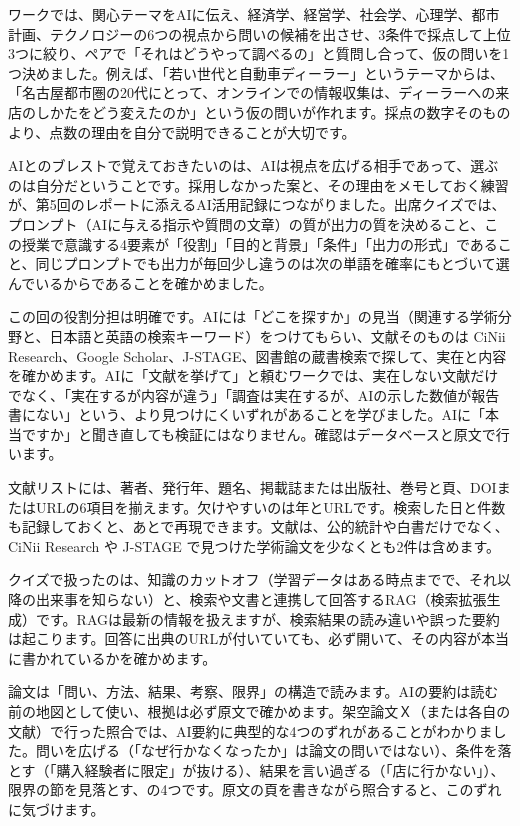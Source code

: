 ワークでは、関心テーマをAIに伝え、経済学、経営学、社会学、心理学、都市計画、テクノロジーの6つの視点から問いの候補を出させ、3条件で採点して上位3つに絞り、ペアで「それはどうやって調べるの」と質問し合って、仮の問いを1つ決めました。例えば、「若い世代と自動車ディーラー」というテーマからは、「名古屋都市圏の20代にとって、オンラインでの情報収集は、ディーラーへの来店のしかたをどう変えたのか」という仮の問いが作れます。採点の数字そのものより、点数の理由を自分で説明できることが大切です。

AIとのブレストで覚えておきたいのは、AIは視点を広げる相手であって、選ぶのは自分だということです。採用しなかった案と、その理由をメモしておく練習が、第5回のレポートに添えるAI活用記録につながりました。出席クイズでは、プロンプト（AIに与える指示や質問の文章）の質が出力の質を決めること、この授業で意識する4要素が「役割」「目的と背景」「条件」「出力の形式」であること、同じプロンプトでも出力が毎回少し違うのは次の単語を確率にもとづいて選んでいるからであることを確かめました。


この回の役割分担は明確です。AIには「どこを探すか」の見当（関連する学術分野と、日本語と英語の検索キーワード）をつけてもらい、文献そのものは CiNii Research、Google Scholar、J-STAGE、図書館の蔵書検索で探して、実在と内容を確かめます。AIに「文献を挙げて」と頼むワークでは、実在しない文献だけでなく、「実在するが内容が違う」「調査は実在するが、AIの示した数値が報告書にない」という、より見つけにくいずれがあることを学びました。AIに「本当ですか」と聞き直しても検証にはなりません。確認はデータベースと原文で行います。

文献リストには、著者、発行年、題名、掲載誌または出版社、巻号と頁、DOIまたはURLの6項目を揃えます。欠けやすいのは年とURLです。検索した日と件数も記録しておくと、あとで再現できます。文献は、公的統計や白書だけでなく、CiNii Research や J-STAGE で見つけた学術論文を少なくとも2件は含めます。

クイズで扱ったのは、知識のカットオフ（学習データはある時点までで、それ以降の出来事を知らない）と、検索や文書と連携して回答するRAG（検索拡張生成）です。RAGは最新の情報を扱えますが、検索結果の読み違いや誤った要約は起こります。回答に出典のURLが付いていても、必ず開いて、その内容が本当に書かれているかを確かめます。


論文は「問い、方法、結果、考察、限界」の構造で読みます。AIの要約は読む前の地図として使い、根拠は必ず原文で確かめます。架空論文Ｘ（または各自の文献）で行った照合では、AI要約に典型的な4つのずれがあることがわかりました。問いを広げる（「なぜ行かなくなったか」は論文の問いではない）、条件を落とす（「購入経験者に限定」が抜ける）、結果を言い過ぎる（「店に行かない」）、限界の節を見落とす、の4つです。原文の頁を書きながら照合すると、このずれに気づけます。

